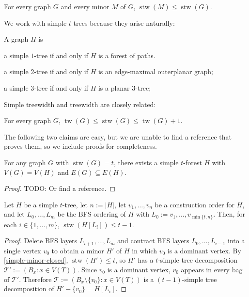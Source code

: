 \documentclass[kpfonts]{patmorin}
\DeclareMathOperator{\tw}{tw}
\DeclareMathOperator{\stw}{stw}
\theoremstyle{named}
\begin{document}
\begin{lem}\label{simple-minor-closed}
    For every graph $G$ and every minor $M$ of $G$, $\stw(M)\le\stw(G)$.
\end{lem}

We work with simple $t$-trees because they arise naturally:

\begin{lem}\label{simple-small-cases}
    A graph $H$ is
    \begin{compactenum}[(i)]
        \item a simple $1$-tree if and only if $H$ is a forest of paths.
        \item a simple $2$-tree if and only if $H$ is an edge-maximal outerplanar graph;
        \item a simple $3$-tree if and only if $H$ is a planar 3-tree;
    \end{compactenum}
\end{lem}

Simple treewidth and treewidth are closely related:

\begin{lem}\label{simple-treewidth-vs-treewidth}\cite{knauer.ueckerdt:simple}
    For every graph $G$, $\tw(G)\le \stw(G)\le \tw(G)+1$.
\end{lem}

The following two claims are easy, but we are unable to find a reference that proves them, so we include proofs for completeness.

\begin{clm}\label{simple-subgraph}
    For any graph $G$ with $\stw(G)=t$, there exists a simple $t$-forest $H$ with $V(G)= V(H)$ and $E(G)\subseteq E(H)$.
\end{clm}

\begin{proof}
    TODO: Or find a reference.
\end{proof}

\begin{clm}\label{simple-bfs-layers}
    Let $H$ be a simple $t$-tree, let $n:=|H|$, let $v_1,\ldots,v_n$ be a construction order for $H$, and let $L_0,\ldots,L_m$ be the BFS ordering of $H$ with $L_0:=v_1,\ldots,v_{\min\{t,n\}}$.   Then, for each $i\in\{1,\ldots,m\}$, $\stw(H[L_i])\le t-1$.
\end{clm}

\begin{proof}
    Delete BFS layers $L_{i+1},\ldots,L_m$ and contract BFS layers $L_0,\ldots,L_{i-1}$ into a single vertex $v_0$ to obtain a minor $H'$ of $H$ in which $v_0$ is a dominant vertex.  By \cref{simple-minor-closed}, $\stw(H')\le t$, so $H'$ has a $t$-simple tree decomposition $\mathcal{T}':=(B_x:x\in V(T))$.  Since $v_0$ is a dominant vertex, $v_0$ appears in every bag of $\mathcal{T}'$.  Therefore $\mathcal{T}:=(B_x\setminus\{v_0\}:x\in V(T))$ is a $(t-1)$-simple tree decomposition of $H'-\{v_0\}=H[L_i]$.
\end{proof}
\end{document}
